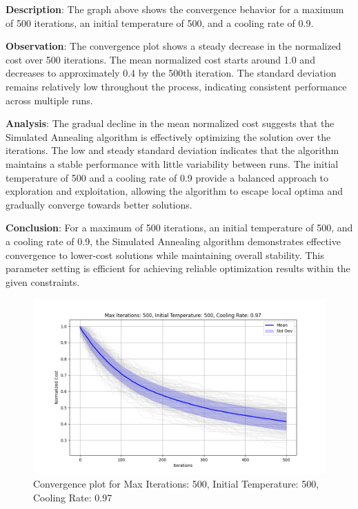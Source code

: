 \documentclass{article}
\begin{document}
    \textbf{Description}: The graph above shows the convergence behavior for a maximum of 500 iterations, an initial temperature of 500, and a cooling rate of 0.9.

    \textbf{Observation}: The convergence plot shows a steady decrease in the normalized cost over 500 iterations. The mean normalized cost starts around 1.0 and decreases to approximately 0.4 by the 500th iteration. The standard deviation remains relatively low throughout the process, indicating consistent performance across multiple runs.

    \textbf{Analysis}: The gradual decline in the mean normalized cost suggests that the Simulated Annealing algorithm is effectively optimizing the solution over the iterations. The low and steady standard deviation indicates that the algorithm maintains a stable performance with little variability between runs. The initial temperature of 500 and a cooling rate of 0.9 provide a balanced approach to exploration and exploitation, allowing the algorithm to escape local optima and gradually converge towards better solutions.

    \textbf{Conclusion}: For a maximum of 500 iterations, an initial temperature of 500, and a cooling rate of 0.9, the Simulated Annealing algorithm demonstrates effective convergence to lower-cost solutions while maintaining overall stability. This parameter setting is efficient for achieving reliable optimization results within the given constraints.

    \begin{figure}[H]
        \centering
        \includegraphics[width=\textwidth]{simulated_annealing/max_iter_500_init_temp_500_cooling_rate_0.97}
        \caption{Convergence plot for Max Iterations: 500, Initial Temperature: 500, Cooling Rate: 0.97}
        \label{fig:sa_500_500_0.97}
    \end{figure}
\end{document}
